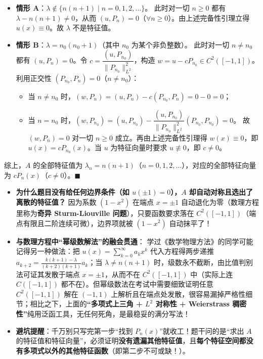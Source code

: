 \documentclass[11pt,a4paper]{article}
\providecommand{\tightlist}{\setlength{\itemsep}{2pt}\setlength{\parskip}{0pt}}
\newcommand{\SubPillCoral}[1]{%
  \Needspace{4.5\baselineskip}\vspace{5.5pt}\noindent
  \tcbox[on line, colback=CoralSoft, colframe=CoralMain!45!BorderColor, boxrule=0.45pt,
    arc=3.5pt, left=6pt, right=6pt, top=2pt, bottom=2pt]{\small\bfseries\color{CoralMain}#1}%
  \par\vspace{3pt}%
}
\begin{document}
\begin{enumerate}
  \begin{itemize}
  \tightlist
  \item
    \textbf{情形 A}：\(\lambda \notin \{n(n+1) \mid n = 0, 1, 2, \dots\}\)。 此时对一切 \(n \ge 0\) 都有 \(\lambda - n(n+1) \neq 0\)，从而 \((u, P_n) = 0\)（\(\forall n \ge 0\)）。由上述完备性引理立得 \(u(x) \equiv 0\)。故 \(\lambda\) 不是特征值。
  \item
    \textbf{情形 B}：\(\lambda = n_0(n_0+1)\)（其中 \(n_0\) 为某个非负整数）。 此时对一切 \(n \neq n_0\) 都有 \((u, P_n) = 0\)。令 \(c = \dfrac{(u, P_{n_0})}{\|P_{n_0}\|_{L^2}^2}\)，构造 \(w = u - c P_{n_0} \in C^2([-1,1])\)。利用正交性 \((P_{n_0}, P_n) = 0\)（\(n \neq n_0\)）：

    \begin{itemize}
    \tightlist
    \item
      当 \(n \neq n_0\) 时，\((w, P_n) = (u, P_n) - c(P_{n_0}, P_n) = 0 - 0 = 0\)；
    \item
      当 \(n = n_0\) 时，\((w, P_{n_0}) = (u, P_{n_0}) - \dfrac{(u, P_{n_0})}{\|P_{n_0}\|_{L^2}^2}(P_{n_0}, P_{n_0}) = 0\)。 故 \((w, P_n) = 0\) 对一切 \(n \ge 0\) 成立。再由上述完备性引理得 \(w(x) \equiv 0\)，即 \(u(x) = c P_{n_0}(x)\)。当 \(u\) 为特征向量时要求 \(u \not\equiv 0\)，即 \(c \neq 0\)。
    \end{itemize}
  \end{itemize}
\end{enumerate}

综上，\(A\) 的全部特征值为 \(\lambda_n = n(n+1)\)（\(n = 0, 1, 2, \dots\)），对应的全部特征向量为 \(c P_n(x)\)（\(c \neq 0\)）。\(\blacksquare\)

\SubPillCoral{【考点复盘与避坑提示】}

\begin{itemize}
\tightlist
\item
  \textbf{为什么题目没有给任何边界条件（如 \(u(\pm 1)=0\)），\(A\) 却自动对称且选出了离散的特征值？} 因为系数 \((1-x^2)\) 在端点 \(x = \pm 1\) 自动退化为零（数理方程里称为\textbf{奇异 Sturm-Liouville 问题}），只要函数要求落在 \(C^2([-1,1])\)（端点有限且二阶连续可微），边界项就被 \((1-x^2)\) 自动抹平了！
\item
  \textbf{与数理方程中``幂级数解法''的融会贯通}： 学过《数学物理方法》的同学可能记得另一种做法：把 \(u(x) = \sum_{k=0}^\infty a_k x^k\) 代入方程得两步递推 \(a_{k+2} = \frac{k(k+1)-\lambda}{(k+2)(k+1)} a_k\)；当 \(\lambda \neq n(n+1)\) 时，级数永不截断，由比值判别法可证其发散于端点 \(x = \pm 1\)，从而不在 \(C^2([-1,1])\) 中（实际上连 \(C([-1,1])\) 都不在）。但幂级数法在考试中需要细致证明任意 \(C^2([-1,1])\) 解在 \((-1,1)\) 上解析且在端点处发散，很容易漏掉严格性细节；相比之下，上面的\textbf{``多项式上三角 + \(L^2\) 对称性 + Weierstrass 稠密性''}纯用泛函工具，无任何死角，是最稳妥的满分写法！
\item
  \textbf{避坑提醒}：千万别只写完第一步``找到 \(P_n(x)\)''就收工！题干问的是``求出 \(A\) 的特征值和特征向量''，必须证明\textbf{没有遗漏其他特征值}，且\textbf{每个特征空间都没有多项式以外的其他特征函数}（即第二步不可或缺！）。
\end{itemize}
\end{document}
